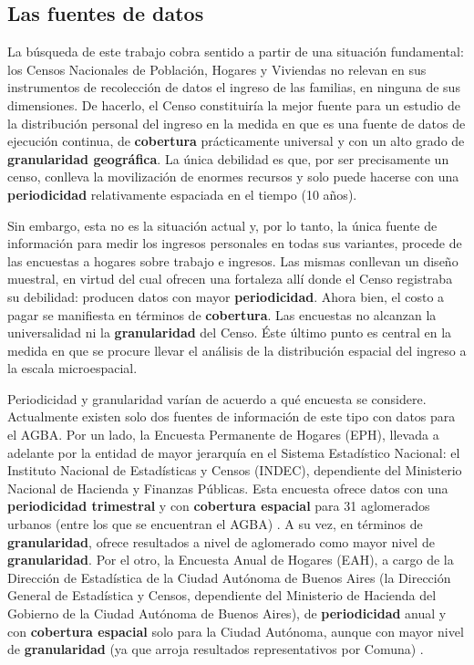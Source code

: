 	\subsection{Las fuentes de datos}
La búsqueda de este trabajo cobra sentido a partir de una situación fundamental: los Censos Nacionales de Población, Hogares y Viviendas no relevan en sus instrumentos de recolección de datos el ingreso de las familias, en ninguna de sus dimensiones. De hacerlo, el Censo constituiría la mejor fuente para un estudio de la distribución personal del ingreso en la medida en que es una fuente de datos de ejecución continua, de \textbf{cobertura} prácticamente universal y con un alto grado de \textbf{granularidad geográfica}. La única debilidad es que, por ser precisamente un censo, conlleva la movilización de enormes recursos y solo puede hacerse con una \textbf{periodicidad} relativamente espaciada en el tiempo (10 años). 

Sin embargo, esta no es la situación actual y, por lo tanto, la única fuente de información para medir los ingresos personales en todas sus variantes, procede de las encuestas a hogares sobre trabajo e ingresos. Las mismas conllevan un diseño muestral, en virtud del cual ofrecen una fortaleza allí donde el Censo registraba su debilidad: producen datos con mayor \textbf{periodicidad}. Ahora bien, el costo a pagar se manifiesta en términos de \textbf{cobertura}. Las encuestas no alcanzan la universalidad ni la \textbf{granularidad} del Censo. Éste último punto es central en la medida en que se procure llevar el análisis de la distribución espacial del ingreso a la escala microespacial. 

Periodicidad y granularidad varían de acuerdo a qué encuesta se considere. Actualmente existen solo dos fuentes de información de este tipo con datos para el AGBA. Por un lado, la Encuesta Permanente de Hogares (EPH), llevada a adelante por la entidad de mayor jerarquía en el Sistema Estadístico Nacional: el Instituto Nacional de Estadísticas y Censos (INDEC), dependiente del Ministerio Nacional de Hacienda y Finanzas Públicas. Esta encuesta ofrece datos con una \textbf{periodicidad trimestral} y con \textbf{cobertura espacial} para 31 aglomerados urbanos (entre los que se encuentran el AGBA) \cite{indec2003f}. A su vez, en términos de \textbf{granularidad}, ofrece resultados a nivel de aglomerado como mayor nivel de \textbf{granularidad}. Por el otro, la Encuesta Anual de Hogares (EAH), a cargo de la Dirección de Estadística de la Ciudad Autónoma de Buenos Aires (la Dirección General de Estadística y Censos, dependiente del Ministerio de Hacienda del Gobierno de la Ciudad Autónoma de Buenos Aires), de \textbf{periodicidad} anual y con \textbf{cobertura espacial} solo para la Ciudad Autónoma, aunque con mayor nivel de \textbf{granularidad} (ya que arroja resultados representativos por Comuna) \cite{eah}.

